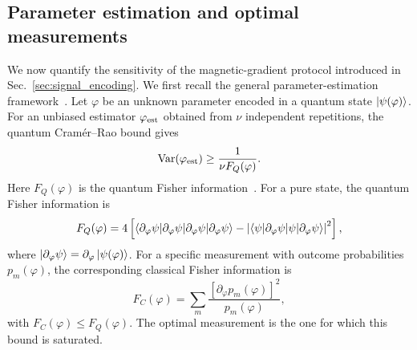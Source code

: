 \documentclass[fleqn,10pt]{wlscirep}
\begin{document}
\subsection{Parameter estimation and optimal measurements}
\label{sec:qfi-est}
We now quantify the sensitivity of the magnetic-gradient protocol introduced in
Sec.~\ref{sec:signal_encoding}.  We first recall the general parameter-estimation
framework~\cite{wiseman_quantum_2010}.  Let $\varphi$ be an unknown parameter encoded in a quantum state
$\ket{\psi(\varphi)}$.  For an unbiased estimator $\varphi_{\rm est}$ obtained from
$\nu$ independent repetitions, the quantum Cramér--Rao bound gives
\begin{equation}
  \mathrm{Var}(\varphi_{\rm est})
  \geq
  \frac{1}{\nu F_Q(\varphi)} .
  \label{eq:qcrb_general}
\end{equation}
Here $F_Q(\varphi)$ is the quantum Fisher information~\cite{braunstein1994statistical,paris2009quantum}. For a pure state, the quantum Fisher information is
\begin{equation}
  F_Q(\varphi)
  =
  4
  \left[
  \braket{\partial_\varphi\psi|\partial_\varphi\psi}
  -
  \left|
  \braket{\psi|\partial_\varphi\psi}
  \right|^2
  \right],
  \label{eq:qfi_pure_general}
\end{equation}
where $\ket{\partial_\varphi\psi}=\partial_\varphi\ket{\psi(\varphi)}$.  For a
specific measurement with outcome probabilities $p_m(\varphi)$, the corresponding
classical Fisher information is
\begin{equation}
  F_C(\varphi)
  =
  \sum_m
  \frac{\left[\partial_\varphi p_m(\varphi)\right]^2}{p_m(\varphi)} ,
  \label{eq:classical_fisher_general}
\end{equation}
with $F_C(\varphi)\leq F_Q(\varphi)$.  The optimal measurement is the one for which
this bound is saturated.
\end{document}
